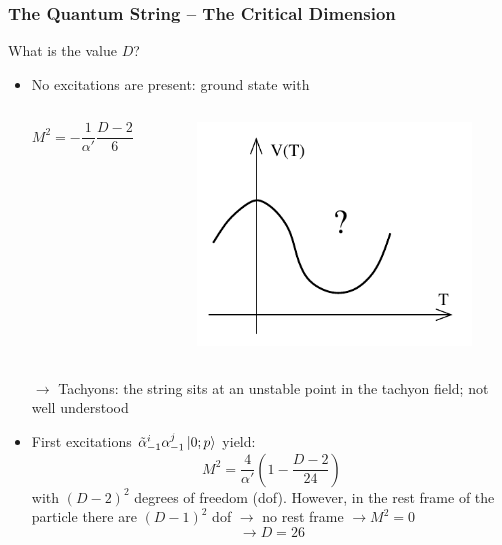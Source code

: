 \documentclass[aspectratio=169]{beamer}
\begin{document}
	\begin{frame}
		\frametitle{The Quantum String -- The Critical Dimension}
		What is the value $D$?
		\begin{itemize}
			\item No excitations are present: ground state with
			\begin{columns}
				\begin{column}{0.6\linewidth}
			\begin{equation*}
				M^2 = -\frac{1}{\alpha'}\frac{D-2}{6} \quad < 0
			\end{equation*}
			\end{column}
			\begin{column}{0.4\linewidth}
				\begin{figure}
					\includegraphics[width=0.4\linewidth]{res/tachyon}
				\end{figure}
				
			\end{column}
			\end{columns}
			$\rightarrow$ Tachyons: the string sits at an unstable point in the tachyon field; not well understood
			\item First excitations $\tilde{\alpha}^i_{-1}\alpha^j_{-1}\ket{0;p}$ yield:
			\begin{equation*}
				M^2 = \frac{4}{\alpha'}\left(1-\frac{D-2}{24}\right)
			\end{equation*}
			with $(D-2)^2$ degrees of freedom (dof). However, in the rest frame of the particle there are $(D-1)^2$ dof $\rightarrow$ no rest frame $\rightarrow M^2=0$
			\[\rightarrow D=26\]
		\end{itemize}
	\end{frame}
\end{document}
